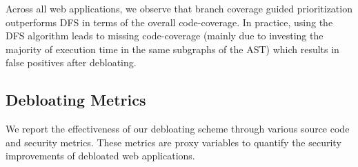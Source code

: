 {Across all web applications, we observe that branch coverage guided prioritization outperforms DFS in terms of the overall code-coverage. 
In practice, using the DFS algorithm leads to missing code-coverage (mainly due to investing the majority of execution time in the same subgraphs of the AST) which results in false positives after debloating. 






\subsection{Debloating Metrics}
We report the effectiveness of our debloating scheme through various source code and security metrics. 
These metrics are proxy variables to quantify the security improvements of debloated web applications. 

}
